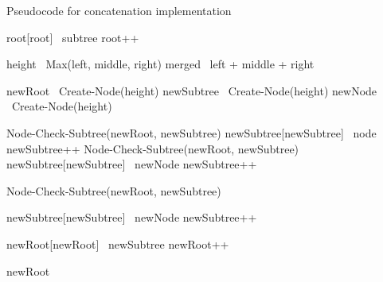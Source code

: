\begin{listing}[ht!]
    \caption{Pseudocode for concatenation implementation}
    \label{lst:rrb-tree-concat}

    \begin{algorithmic}
                \State root[root] \la\ subtree
                \State root++
            \EndIf
        \EndProcedure

    \end{algorithmic}

    \begin{algorithmic}

            \State height \la\ Max(left, middle, right)
            \State merged \la\ left + middle + right

            \State newRoot \la\ Create-Node(height)
            \State newSubtree \la\ Create-Node(height)
            \State newNode \la\ Create-Node(height)

                    \State Node-Check-Subtree(newRoot, newSubtree)
                    \State newSubtree[newSubtree\ts[len]] \la\ node
                    \State newSubtree++
                \Else
                            \State Node-Check-Subtree(newRoot, newSubtree)
                            \State newSubtree[newSubtree\ts[len]] \la\ newNode
                            \State newSubtree++
                        \EndIf
                    \EndFor
                \EndIf
            \EndFor

            \State Node-Check-Subtree(newRoot, newSubtree)

                \State newSubtree[newSubtree\ts[len]] \la\ newNode
                \State newSubtree++
            \EndIf

                \State newRoot[newRoot\ts[len]] \la\ newSubtree
                \State newRoot++
            \EndIf

            \State \Return newRoot
        \EndFunction

    \end{algorithmic}


\end{listing}
